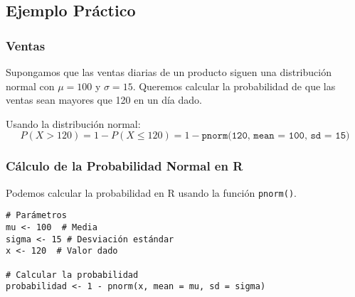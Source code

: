 \documentclass[aspectratio=169]{beamer}
\begin{document}
\subsection{Ejemplo Práctico}
\begin{frame}
\frametitle{Ventas}
Supongamos que las ventas diarias de un producto siguen una distribución normal con \(\mu = 100\) y \(\sigma = 15\). Queremos calcular la probabilidad de que las ventas sean mayores que 120 en un día dado.

Usando la distribución normal:
\[
P(X > 120) = 1 - P(X \leq 120) = 1 - \texttt{pnorm(120, mean = 100, sd = 15)}
\]
\end{frame}

\begin{frame}[fragile]
\frametitle{Cálculo de la Probabilidad Normal en R}
Podemos calcular la probabilidad en R usando la función \texttt{pnorm()}.

\begin{verbatim}
# Parámetros
mu <- 100  # Media
sigma <- 15 # Desviación estándar
x <- 120  # Valor dado

# Calcular la probabilidad
probabilidad <- 1 - pnorm(x, mean = mu, sd = sigma)
\end{verbatim}

\end{frame}
\end{document}
